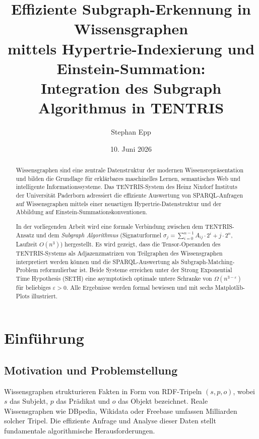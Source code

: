 ﻿\documentclass[a4paper,12pt]{article}
\title{\textbf{Effiziente Subgraph-Erkennung in Wissensgraphen\\
mittels Hypertrie-Indexierung und Einstein-Summation:\\
Integration des Subgraph Algorithmus in TENTRIS}}
\author{Stephan Epp}
\date{10. Juni 2026}
\theoremstyle{definition}
\begin{document}
\maketitle

\begin{abstract}
Wissensgraphen sind eine zentrale Datenstruktur der modernen Wissensrepräsentation und bilden
die Grundlage für erklärbares maschinelles Lernen, semantisches Web und intelligente
Informationssysteme. Das TENTRIS-System des Heinz Nixdorf Instituts der Universität Paderborn
adressiert die effiziente Auswertung von SPARQL-Anfragen auf Wissensgraphen mittels einer
neuartigen Hypertrie-Datenstruktur und der Abbildung auf Einstein-Summationskonventionen.

In der vorliegenden Arbeit wird eine formale Verbindung zwischen dem TENTRIS-Ansatz und dem
\emph{Subgraph Algorithmus} (Signaturformel $\sigma_j = \sum_{i=0}^{n-1} A_{ij} \cdot 2^i +
j \cdot 2^n$, Laufzeit $O(n^3)$) hergestellt. Es wird gezeigt, dass die Tensor-Operanden
des TENTRIS-Systems als Adjazenzmatrizen von Teilgraphen des Wissensgraphen interpretiert
werden können und die SPARQL-Auswertung als Subgraph-Matching-Problem reformulierbar ist.
Beide Systeme erreichen unter der Strong Exponential Time Hypothesis (SETH) eine
asymptotisch optimale untere Schranke von $\Omega(n^{3-\varepsilon})$ für beliebiges
$\varepsilon > 0$. Alle Ergebnisse werden formal bewiesen und mit sechs Matplotlib-Plots
illustriert.
\end{abstract}

\tableofcontents
\newpage

\section{Einführung}

\subsection{Motivation und Problemstellung}

Wissensgraphen strukturieren Fakten in Form von RDF-Tripeln $(s, p, o)$, wobei $s$ das
Subjekt, $p$ das Prädikat und $o$ das Objekt bezeichnet. Reale Wissensgraphen wie DBpedia,
Wikidata oder Freebase umfassen Milliarden solcher Tripel. Die effiziente Anfrage und
Analyse dieser Daten stellt fundamentale algorithmische Herausforderungen.
\end{document}
